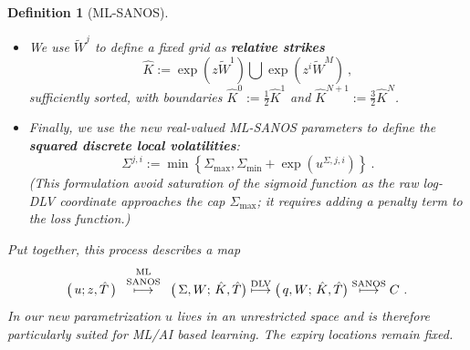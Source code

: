 \documentclass[11pt,a4paper]{article}
\newtheorem{definition}{Definition}[section]
\DeclareRobustCommand{\supstack}[2]{\stackrel{\mbox{{\scriptsize ${#1}$}}}{ {#2} }}     %
\begin{document}
\begin{definition}[ML-SANOS]
\begin{itemize}
\begin{equation}
            \end{equation}
            With these quantities define the \textbf{total volatilities}
             \begin{equation}\label{eq:totalW}
             \widetilde W^j := \sum_{\ell=1}^{j} \sigma^\ell \sqrt{\Delta\hat T^\ell}
             \qquad\mbox{and}\qquad
             W^j := \eta^{\mathrm f} \sigma^1 \sqrt{\Delta\hat T^1}\ + \eta^{\mathrm{term}} \sum_{\ell=2}^{j}  \sigma^\ell \sqrt{\Delta\hat T^\ell}\ .
             \end{equation}
        \item We use $\widetilde W^j$ to define a fixed grid as \textbf{relative strikes}
              \begin{equation}\label{eq:constructK}
                \hat K := \exp\left( z \widetilde W^1 \right) \bigcup \exp\left( z^i \widetilde W^M \right) \ ,
              \end{equation}
              sufficiently sorted, 
              with boundaries $\hat K^{0}:=\frac12 \hat K^{1}$ and $\hat K^{N+1} := \frac32 \hat K^{N}$.
        \item Finally, we use the new real-valued ML-SANOS parameters to define the \textbf{squared discrete local volatilities}:
              \begin{equation}\label{eq:defDLVdsq}
                 \Sigma^{j,i}
                 :=\min\!\left\{\Sigma_{\max},
                    \Sigma_{\min}+\exp(u^{\Sigma,j,i})\right\}\ .
              \end{equation}
              (This formulation avoid saturation of the sigmoid function as the raw log-DLV coordinate approaches the cap  $\Sigma_{\max}$;
              it requires adding a penalty term to the loss function.)

    \end{itemize}
    Put together, this process describes a map
    \begin{equation}
        \big(\,u;z,\hat T\,\big)  \supstack{
            \begin{array}{c}
                \mathrm{ML}\\
                \mathrm{SANOS}
                \end{array}
        }\longmapsto \big(\, \Sigma,W;\,\hat K,\hat T \big) 
        \supstack{\mathrm{DLV}}\longmapsto \big(\,q,W;\,\hat K,\hat T \big)  \supstack{\mathrm{SANOS}}\longmapsto C \ .
    \end{equation}
    In our new parametrization $u$ lives in an unrestricted space and is therefore
    particularly suited for ML/AI based learning.  The expiry locations remain fixed.
\end{definition}
\end{document}
